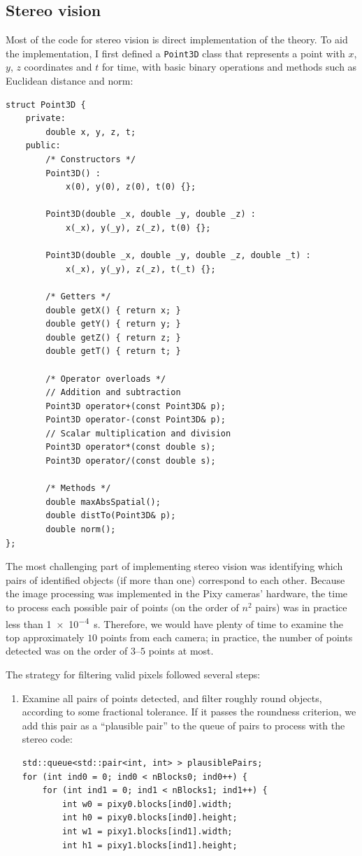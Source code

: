 \documentclass[letterpaper, 11pt]{article}
\begin{document}
\begin{enumerate}[label=\textbf{\arabic*.}]
\subsection{Stereo vision}
Most of the code for stereo vision is direct implementation of the theory. To aid the implementation, I first defined a \verb|Point3D| class that represents a point with $x$, $y$, $z$ coordinates and $t$ for time, with basic binary operations and methods such as Euclidean distance and norm:
\begin{verbatim}
struct Point3D {
    private:
        double x, y, z, t;
    public:
        /* Constructors */
        Point3D() :
            x(0), y(0), z(0), t(0) {};

        Point3D(double _x, double _y, double _z) :
            x(_x), y(_y), z(_z), t(0) {};

        Point3D(double _x, double _y, double _z, double _t) :
            x(_x), y(_y), z(_z), t(_t) {};

        /* Getters */
        double getX() { return x; }
        double getY() { return y; }
        double getZ() { return z; }
        double getT() { return t; }

        /* Operator overloads */
        // Addition and subtraction
        Point3D operator+(const Point3D& p);
        Point3D operator-(const Point3D& p);
        // Scalar multiplication and division
        Point3D operator*(const double s);
        Point3D operator/(const double s);

        /* Methods */
        double maxAbsSpatial();
        double distTo(Point3D& p);
        double norm();
};
\end{verbatim}
The most challenging part of implementing stereo vision was identifying which pairs of identified objects (if more than one) correspond to each other. Because the image processing was implemented in the Pixy cameras' hardware, the time to process each possible pair of points (on the order of $n^2$ pairs) was in practice less than \SI{1e-4}{s}. Therefore, we would have plenty of time to examine the top approximately $10$ points from each camera; in practice, the number of points detected was on the order of $3$--$5$ points at most.

The strategy for filtering valid pixels followed several steps:
\begin{enumerate}[label=\textbf{Step \arabic*.}]
    \item Examine all pairs of points detected, and filter roughly round objects, according to some fractional tolerance. If it passes the roundness criterion, we add this pair as a ``plausible pair'' to the queue of pairs to process with the stereo code:
        \begin{verbatim}
std::queue<std::pair<int, int> > plausiblePairs;
for (int ind0 = 0; ind0 < nBlocks0; ind0++) {
    for (int ind1 = 0; ind1 < nBlocks1; ind1++) {
        int w0 = pixy0.blocks[ind0].width;
        int h0 = pixy0.blocks[ind0].height;
        int w1 = pixy1.blocks[ind1].width;
        int h1 = pixy1.blocks[ind1].height;


\end{verbatim}
\end{enumerate}
\end{enumerate}
\end{document}
